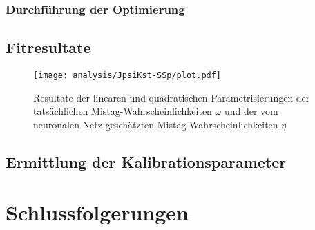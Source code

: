 
\subsubsection{Durchführung der Optimierung}

\subsection{Fitresultate}

\begin{figure}
  \texttt{[image: analysis/JpsiKst-SSp/plot.pdf]}
  \caption{Resultate der linearen und quadratischen Parametrisierungen der tatsächlichen Mistag-Wahrscheinlichkeiten $ω$ und der vom neuronalen Netz geschätzten Mistag-Wahrscheinlichkeiten $η$}
\end{figure}



\subsection{Ermittlung der Kalibrationsparameter}


\section{Schlussfolgerungen}

